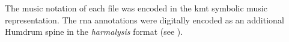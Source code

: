
The music notation of each file was encoded in the
\gls{kmt} symbolic music representation. The \gls{rna}
annotations were digitally encoded as an additional Humdrum
\gls{spine} in the \emph{harmalysis} format (see
).
